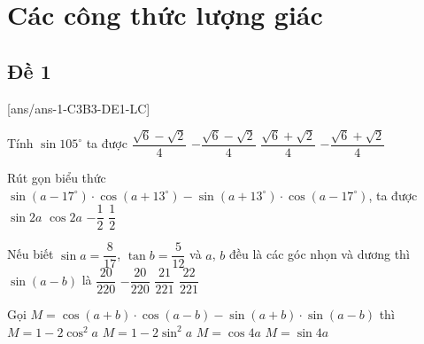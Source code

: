 \section{Các công thức lượng giác}

\subsection{Đề 1}
[ans/ans-1-C3B3-DE1-LC]
\caulc
\begin{ex}%
Tính $\sin{105^\circ}$ ta được
\choice
{$\dfrac{\sqrt{6}-\sqrt{2}}{4}$}
{$-\dfrac{\sqrt{6}-\sqrt{2}}{4}$}
{\True $\dfrac{\sqrt{6}+\sqrt{2}}{4}$}
{$-\dfrac{\sqrt{6}+\sqrt{2}}{4}$}
\end{ex}

\begin{ex}%
Rút gọn biểu thức $\sin (a-17^\circ)\cdot \cos (a+13^\circ)-\sin (a+13^\circ)\cdot \cos (a-17^\circ)$,
ta được
\choice
{$\sin 2a$}
{$\cos 2a$}
{\True $-\dfrac{1}{2}$}
{$\dfrac{1}{2}$}
\end{ex}

\begin{ex}%
Nếu biết $\sin a=\dfrac{8}{17}$, $\tan b=\dfrac{5}{12}$ và $a$, $b$ đều là các góc nhọn và dương thì $\sin (a-b)$ là
\choice
{$\dfrac{20}{220}$}
{$-\dfrac{20}{220}$}
{\True $\dfrac{21}{221}$}
{$\dfrac{22}{221}$}
\end{ex}

\begin{ex}%
Gọi $M=\cos (a+b)\cdot \cos (a-b)-\sin (a+b)\cdot \sin (a-b)$ thì
\choice
{$M=1-2\cos^2a$}
{\True $M=1-2\sin^2a$}
{$M=\cos 4a$}
{$M=\sin 4a$}
\end{ex}

